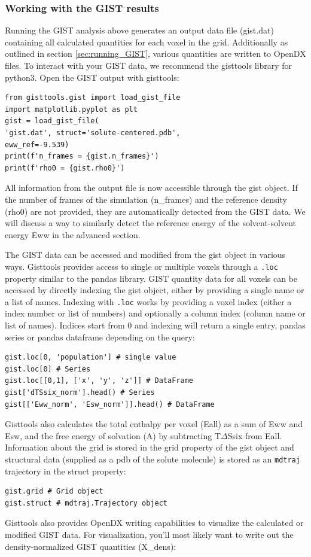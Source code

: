 \documentclass[9pt,tutorial]{livecoms}
\newcommand{\software}{\texttt}
\newcommand{\code}{\texttt}
\begin{document}
\subsubsection{Working with the GIST results}
Running the GIST analysis above generates an output data file (gist.dat) containing all calculated quantities for each voxel in the grid. 
Additionally as outlined in section \ref{sec:running_GIST}, various quantities are written to OpenDX files.
To interact with your GIST data, we recommend the gisttools library for python3. Open the GIST output with gisttools:
\begin{lstlisting}[style=python]
from gisttools.gist import load_gist_file
import matplotlib.pyplot as plt
gist = load_gist_file(
'gist.dat', struct='solute-centered.pdb',  
eww_ref=-9.539)
print(f'n_frames = {gist.n_frames}')
print(f'rho0 = {gist.rho0}')
\end{lstlisting}
All information from the output file is now accessible through the gist object. 
If the number of frames of the simulation (n\_frames) and the reference density (rho0) are not provided, they are automatically detected from the GIST data. 
We will discuss a way to similarly detect the reference energy of the solvent-solvent energy Eww in the advanced section.

The GIST data can be accessed and modified from the gist object in various ways.
Gisttools provides access to single or multiple voxels through a \code{.loc} property similar to the pandas library. 
GIST quantity data for all voxels can be accessed by directly indexing the gist object, either by providing a single name or a list of names.
Indexing with \code{.loc} works by providing a voxel index (either a index number or list of numbers) and optionally a column index (column name or list of names). Indices start from 0 and indexing will return a single entry, pandas series or pandas dataframe depending on the query:
\begin{lstlisting}[style=python]
gist.loc[0, 'population'] # single value
gist.loc[0] # Series
gist.loc[[0,1], ['x', 'y', 'z']] # DataFrame
gist['dTSsix_norm'].head() # Series
gist[['Eww_norm', 'Esw_norm']].head() # DataFrame
\end{lstlisting}
Gisttools also calculates the total enthalpy per voxel (Eall) as a sum of Eww and Esw, and the free energy of solvation (A) by subtracting T$\Delta$Ssix from Eall.\\
Information about the grid is stored in the grid property of the gist object and structural data (supplied as a pdb of the solute molecule) is stored as an \software{mdtraj} trajectory in the struct property:
\begin{lstlisting}[style=python]
gist.grid # Grid object
gist.struct # mdtraj.Trajectory object
\end{lstlisting}
Gisttools also provides OpenDX writing capabilities to visualize the calculated or modified GIST data. For visualization, you'll most likely want to write out the density-normalized GIST quantities (X\_dens):
\end{document}
